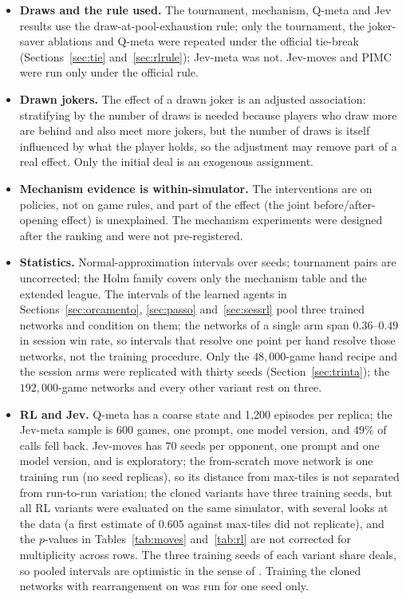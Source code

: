 \documentclass[11pt]{article}
\begin{document}
\begin{itemize}
\item \textbf{Draws and the rule used.} The tournament, mechanism, Q-meta and Jev results use the draw-at-pool-exhaustion rule; only the tournament, the joker-saver ablations and Q-meta were repeated under the official tie-break (Sections~\ref{sec:tie} and~\ref{sec:rlrule}); Jev-meta was not. Jev-moves and PIMC were run only under the official rule.
\item \textbf{Drawn jokers.} The effect of a drawn joker is an adjusted association: stratifying by the number of draws is needed because players who draw more are behind and also meet more jokers, but the number of draws is itself influenced by what the player holds, so the adjustment may remove part of a real effect. Only the initial deal is an exogenous assignment.
\item \textbf{Mechanism evidence is within-simulator.} The interventions are on policies, not on game rules, and part of the effect (the joint before/after-opening effect) is unexplained. The mechanism experiments were designed after the ranking and were not pre-registered.
\item \textbf{Statistics.} Normal-approximation intervals over seeds; tournament pairs are uncorrected; the Holm family covers only the mechanism table and the extended league. The intervals of the learned agents in Sections~\ref{sec:orcamento}, \ref{sec:passo} and~\ref{sec:sessrl} pool three trained networks and condition on them; the networks of a single arm span $0.36$--$0.49$ in session win rate, so intervals that resolve one point per hand resolve those networks, not the training procedure. Only the $48{,}000$-game hand recipe and the session arms were replicated with thirty seeds (Section~\ref{sec:trinta}); the $192{,}000$-game networks and every other variant rest on three.
\item \textbf{RL and Jev.} Q-meta has a coarse state and 1{,}200 episodes per replica; the Jev-meta sample is 600 games, one prompt, one model version, and $49\%$ of calls fell back. Jev-moves has $70$ seeds per opponent, one prompt and one model version, and is exploratory; the from-scratch move network is one training run (no seed replicas), so its distance from max-tiles is not separated from run-to-run variation; the cloned variants have three training seeds, but all RL variants were evaluated on the same simulator, with several looks at the data (a first estimate of $0.605$ against max-tiles did not replicate), and the $p$-values in Tables~\ref{tab:moves} and~\ref{tab:rl} are not corrected for multiplicity across rows. The three training seeds of each variant share deals, so pooled intervals are optimistic in the sense of \cite{agarwal2021}. Training the cloned networks with rearrangement on was run for one seed only.

\end{itemize}
\end{document}

